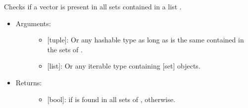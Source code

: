 \documentclass[letterpaper,10pt,english]{sphinxmanual}
\begin{document}

\begin{fulllineitems}
\label{\detokenize{sets:data_tools.sets.in_all}}
Checks if a vector  is present in all sets contained in a list
.
\begin{itemize}
\item {} \begin{description}
\item[{Arguments:}] \leavevmode\begin{itemize}
\item {} 
 {[}tuple{]}: Or any hashable type as long as is the same
contained in the sets of .

\item {} 
 {[}list{]}: Or any iterable type containing {[}set{]} objects.

\end{itemize}

\end{description}

\item {} \begin{description}
\item[{Returns:}] \leavevmode\begin{itemize}
\item {} 
{[}bool{]}:  if  is found in all sets of , 
otherwise.

\end{itemize}

\end{description}


\end{itemize}
\end{fulllineitems}
\end{document}
